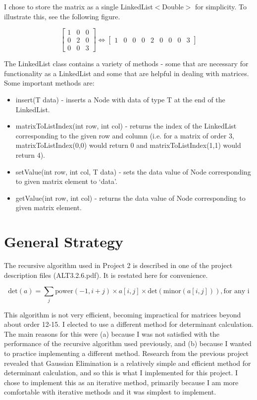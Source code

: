 \documentclass[12pt, titlepage]{article}
\begin{document}
I chose to store the matrix as a single LinkedList$<$Double$>$ for simplicity. To illustrate this, see the following figure.

\[
\begin{bmatrix}
    1 & 0 & 0 \\
    0 & 2 & 0  \\
    0 & 0 & 3 
\end{bmatrix}
\Longleftrightarrow
\begin{bmatrix}
    1 & 0 & 0 & 0 & 2 & 0 & 0 & 0 & 3
\end{bmatrix}
\]

The LinkedList class contains a variety of methods - some that are necessary for functionality as a LinkedList and some that are helpful in dealing with matrices. Some important methods are:
\begin{itemize}
	\item insert(T data) - inserts a Node with data of type T at the end of the LinkedList.
	\item matrixToListIndex(int row, int col) - returns the index of the LinkedList corresponding to the given row and column (i.e. for a matrix of order 3, matrixToListIndex(0,0) would return 0 and matrixToListIndex(1,1) would return 4).
	\item setValue(int row, int col, T data) - sets the data value of Node corresponding to given matrix element to `data'. 
	\item getValue(int row, int col) - returns the data value of Node corresponding to given matrix element.
\end{itemize}




\section{General Strategy}

The recursive algorithm used in Project 2 is described in one of the project description files (ALT3.2.6.pdf). It is restated here for convenience.

\begin{equation*}
\textrm{det}(a) = \sum_j \textrm{power}(-1, i+j) \times a[i,j] \times \textrm{det}(\textrm{minor}(a[i,j])), \textrm{for any i}
\end{equation*}

This algorithm is not very efficient, becoming impractical for matrices beyond about order 12-15. I elected to use a different method for determinant calculation. The main reasons for this were (a) because I was not satisfied with the performance of the recursive algorithm used previously, and (b) because I wanted to practice implementing a different method. Research from the previous project revealed that Gaussian Elimination is a relatively simple and efficient method for determinant calculation, and so this is what I implemented for this project. I chose to implement this as an iterative method, primarily because I am more comfortable with iterative methods and it was simplest to implement.
\end{document}
